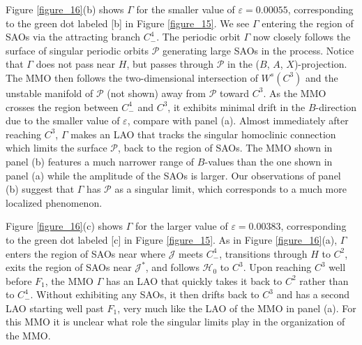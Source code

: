 \documentclass{ws-ijbc}
\begin{document}
Figure \ref{figure_16}(b) shows $\Gamma$ for the smaller value of $\varepsilon=0.00055$, corresponding to the green dot labeled [b] in Figure \ref{figure_15}.  We see $\Gamma$ entering the region of SAOs via the attracting branch $C^4_-$.  The periodic orbit $\Gamma$ now closely follows the surface of singular periodic orbits $\mathscr{P}$ generating large SAOs in the process.  Notice that $\Gamma$ does not pass near $H$, but passes through $\mathscr{P}$ in the ($B$, $A$, $X$)-projection.  The MMO then follows the two-dimensional intersection of $W^s(C^3)$ and the unstable manifold of $\mathscr{P}$ (not shown) away from $\mathscr{P}$ toward $C^3$.  As the MMO crosses the region between $C^4_-$ and $C^3$, it exhibits minimal drift in the $B$-direction due to the smaller value of $\varepsilon$, compare with panel (a).  Almost immediately after reaching $C^3$, $\Gamma$ makes an LAO that tracks the singular homoclinic connection which limits the surface $\mathscr{P}$, back to the region of SAOs.  The MMO shown in panel (b) features a much narrower range of $B$-values than the one shown in panel (a) while the amplitude of the SAOs is larger.  Our observations of panel (b) suggest that $\Gamma$ has $\mathscr{P}$ as a singular limit, which corresponds to a much more localized phenomenon.

Figure \ref{figure_16}(c) shows $\Gamma$ for the larger value of $\varepsilon=0.00383$, corresponding to the green dot labeled [c] in Figure \ref{figure_15}.  As in Figure \ref{figure_16}(a), $\Gamma$ enters the region of SAOs near where $\mathscr{J}$ meets $C^4_-$, transitions through $H$ to $C^2$, exits the region of SAOs near $\mathscr{J}^*$, and follows $\mathscr{H}_0$ to $C^3$.  Upon reaching $C^3$ well before $F_1$, the MMO $\Gamma$ has an LAO that quickly takes it back to $C^2$ rather than to $C^4_-$.  Without exhibiting any SAOs, it then drifts back to $C^3$ and has a second LAO starting well past $F_1$, very much like the LAO of the MMO in panel (a).  For this MMO it is unclear what role the singular limits play in the organization of the MMO.
\end{document}
